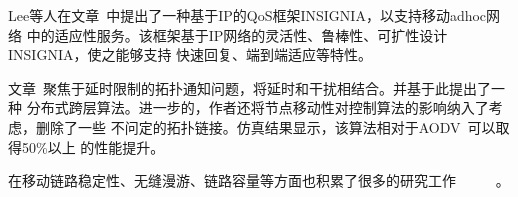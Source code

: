 Lee等人在文章~\cite{insignia}中提出了一种基于IP的QoS框架INSIGNIA，以支持移动adhoc网络
中的适应性服务。该框架基于IP网络的灵活性、鲁棒性、可扩性设计INSIGNIA，使之能够支持
快速回复、端到端适应等特性。

文章~\cite{ITCD}聚焦于延时限制的拓扑通知问题，将延时和干扰相结合。并基于此提出了一种
分布式跨层算法。进一步的，作者还将节点移动性对控制算法的影响纳入了考虑，删除了一些
不问定的拓扑链接。仿真结果显示，该算法相对于AODV~\cite{AODV}可以取得50\%以上
的性能提升。

在移动链路稳定性、无缝漫游、链路容量等方面也积累了很多的研究工作~\cite{mobilitysurvey}
~\cite{2007mobility}~\cite{2002link}~\cite{2001mobility}~\cite{study}。





